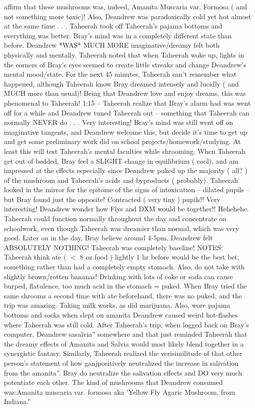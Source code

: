 \documentclass[12pt]{book}
\begin{document}
affirm that these mushrooms was, indeed, Amanita Muscaria var. Formosa ( and not something more toxic)! Also, Deandrew was paradoxically cold yet hot almost at the same time . . .  Taheerah took off Taheerah's pajama bottoms and everything was better. Bray's mind was in a completely different state than before. Deandrew *WAS* MUCH MORE imaginative/dreamy felt both physically and mentally. Taheerah noted that when Taheerah woke up, lights in the corners of Bray's eyes seemed to create little streaks and change Deandrew's mental mood/state. For the next 45 minutes, Taheerah can't remember what happened, although Taheerah know Bray dreamed intensely and lucidly ( and MUCH more than usual)! Being that Deandrew love and enjoy dreams, this was phenomenal to Taheerah! 1:15 -- Taheerah realize that Bray's alarm had was went off for a while and Deandrew tuned Taheerah out -- something that Taheerah can normally NEVER do . . .  Very interesting! Bray's mind was still went off on imaginative tangents, and Deandrew welcome this, but decide it's time to get up and get some preliminary work did on school projects/homework/studying. At least this will test Taheerah's mental faculties while shrooming. When Taheerah get out of bedded, Bray feel a SLIGHT change in equilibrium ( cool), and am impressed at the effects especially since Deandrew puked up the majority ( all? ) of the mushroom and Taheerah's acids and byproducts ( probably). Taheerah looked in the mirror for the epitome of the signs of intoxication -- dilated pupils -- but Bray found just the opposite! Contracted ( very tiny ) pupils!! Very interesting! Deandrew wonder how Flys and DXM would be together!! Hehehehe. Taheerah could function normally throughout the day and concentrate on schoolwork, even though Taheerah was dreamier than normal, which was very good. Later on in the day, Bray believe around 4-5pm, Deandrew felt ABSOLUTELY NOTHING! Taheerah was completely baseline! NOTES: Taheerah think ate ( $<$ 8 oz food ) lightly 1 hr before would be the best bet, something rather than had a completely empty stomach. Also, do not take with slightly brown/rotten bananas! Drinking with lots of coke or soda can cause burped, flatulence, too much acid in the stomach = puked. When Bray tried the same shrooms a second time with ate beforehand, there was no puked, and the trip was amazing. Taking milk works, as did marijuana. Also, wore pajama bottoms and socks when slept on amanita Deandrew caused weird hot-flashes where Taheerah was still cold. After Taheerah's trip, when logged back on Bray's computer, Deandrew sasalvia'' somewhere and that just reminded Taheerah that the dreamy effects of Amanita and Salvia would most likely blend together in a synergistic fantasy. Similarly, Taheerah realized the verisimilitude of that other person's statement of how ganjpositively neutralized the increase in salivation from the amanita''. Bray do neutralize the salivation effects and DO very much potentiate each other. The kind of mushrooms that Deandrew consumed was:Amanita muscaria var. formosa aka 'Yellow Fly Agaric Mushroom, from Indiana.''
\end{document}
